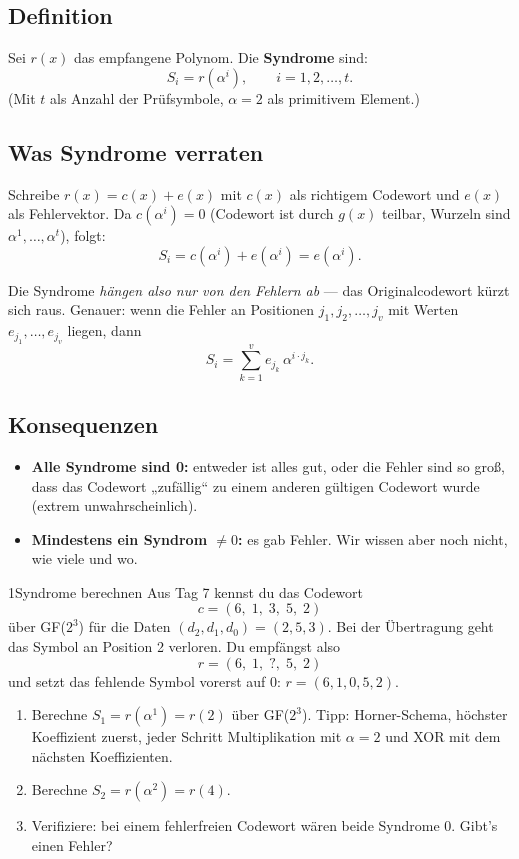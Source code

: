 \subsection*{Definition}

Sei $r(x)$ das empfangene Polynom. Die \textbf{Syndrome} sind:
\[
  S_i = r(\alpha^i), \qquad i = 1, 2, \dots, t.
\]
(Mit $t$ als Anzahl der Prüfsymbole, $\alpha = 2$ als primitivem
Element.)

\subsection*{Was Syndrome verraten}

Schreibe $r(x) = c(x) + e(x)$ mit $c(x)$ als richtigem Codewort und
$e(x)$ als Fehlervektor. Da $c(\alpha^i) = 0$ (Codewort ist durch
$g(x)$ teilbar, Wurzeln sind $\alpha^1, \dots, \alpha^t$), folgt:
\[
  S_i = c(\alpha^i) + e(\alpha^i) = e(\alpha^i).
\]

Die Syndrome \emph{hängen also nur von den Fehlern ab} — das
Originalcodewort kürzt sich raus. Genauer: wenn die Fehler an
Positionen $j_1, j_2, \dots, j_v$ mit Werten $e_{j_1}, \dots, e_{j_v}$
liegen, dann
\[
  S_i = \sum_{k=1}^{v} e_{j_k} \, \alpha^{i \cdot j_k}.
\]

\subsection*{Konsequenzen}

\begin{itemize}
\item \textbf{Alle Syndrome sind 0:} entweder ist alles gut, oder
  die Fehler sind so groß, dass das Codewort „zufällig“ zu einem
  anderen gültigen Codewort wurde (extrem unwahrscheinlich).
\item \textbf{Mindestens ein Syndrom $\ne 0$:} es gab Fehler.
  Wir wissen aber noch nicht, wie viele und wo.
\end{itemize}

\begin{bleistiftuebung}{1}{Syndrome berechnen}
Aus Tag 7 kennst du das Codewort
\[
  c = (6,\; 1,\; 3,\; 5,\; 2)
\]
über GF($2^3$) für die Daten $(d_2, d_1, d_0) = (2, 5, 3)$. Bei der
Übertragung geht das Symbol an Position 2 verloren. Du empfängst
also
\[
  r = (6,\; 1,\; ?,\; 5,\; 2)
\]
und setzt das fehlende Symbol vorerst auf 0:
$r = (6, 1, 0, 5, 2)$.

\begin{enumerate}[label=(\alph*), leftmargin=*]
\item Berechne $S_1 = r(\alpha^1) = r(2)$ über GF($2^3$). Tipp:
  Horner-Schema, höchster Koeffizient zuerst, jeder Schritt
  Multiplikation mit $\alpha = 2$ und XOR mit dem nächsten
  Koeffizienten.

\item Berechne $S_2 = r(\alpha^2) = r(4)$.

\item Verifiziere: bei einem fehlerfreien Codewort wären beide
  Syndrome 0. Gibt's einen Fehler?
\end{enumerate}
\end{bleistiftuebung}

